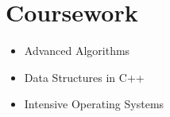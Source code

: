 \section{Coursework}
  \vspace{-10pt} %
  \begin{multicols}{3}
    \begin{itemize}[label=\textbf{$\bullet$}]
      \setlength{\itemsep}{-0.5em} %
      \setlength{\itemindent}{-0.5em} %
      \item{Advanced Algorithms}
      \item{Data Structures in C++}
      \item{Intensive Operating Systems}
    \end{itemize}
  \end{multicols}
